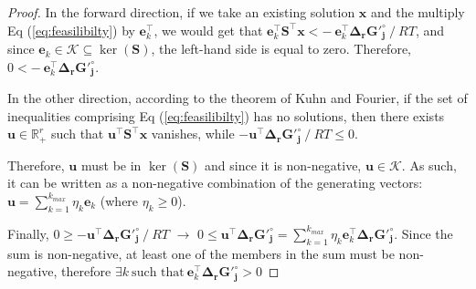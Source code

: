 \documentclass[12pt]{article}
\begin{document}
\begin{proof}
In the forward direction, if we take an existing solution $\mathbf{x}$ and the multiply Eq (\ref{eq:feasilibilty}) by $\mathbf{e}_k^\top$, we would get that
$\mathbf{e}_k^\top \mathbf{S}^\top \mathbf{x} < -~\mathbf{e}_k^\top \mathbf{\Delta_r G'^\circ_j}~/~RT$, and since $\mathbf{e}_k \in \mathcal{K} \subseteq \ker(\mathbf{S})$, the left-hand side is equal to zero. Therefore, $0 < -~\mathbf{e}_k^\top \mathbf{\Delta_r G'^\circ_j}$.

In the other direction, according to the theorem of Kuhn and Fourier, if the set of inequalities comprising Eq (\ref{eq:feasilibilty}) has no solutions, then there exists $\mathbf{u} \in \mathbb{R}_+^r$ such that $\mathbf{u}^\top \mathbf{S}^\top \mathbf{x}$ vanishes, while $-\mathbf{u}^\top \mathbf{\Delta_r G'^\circ_j}~/~RT \le 0$.

Therefore, $\mathbf{u}$ must be in $\ker(\mathbf{S})$ and since it is non-negative, $\mathbf{u} \in \mathcal{K}$. As such, it can be written as a non-negative combination of the generating vectors: $\mathbf{u} = \sum_{k=1}^{k_{max}} \eta_k \mathbf{e}_k$ (where $\eta_k \ge 0$).

Finally, $0 \ge -\mathbf{u}^\top \mathbf{\Delta_r G'^\circ_j}~/~RT$ $\rightarrow$ $0 \le \mathbf{u}^\top \mathbf{\Delta_r G'^\circ_j} = \sum_{k=1}^{k_{max}} \eta_k \mathbf{e}_k^\top \mathbf{\Delta_r G'^\circ_j}$. Since the sum is non-negative, at least one of the members in the sum must be non-negative, therefore $\exists k~\text{such that}~\mathbf{e}_k^\top \mathbf{\Delta_r G'^\circ_j} > 0$


\end{proof}

 
\end{document}
